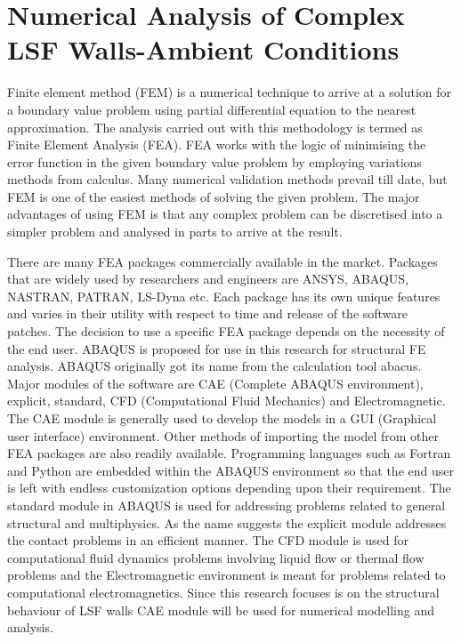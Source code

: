 \section{Numerical Analysis of Complex LSF Walls-Ambient Conditions}

Finite element method (FEM) is a numerical technique to arrive at a solution for a boundary value problem using partial differential equation to the nearest approximation. The analysis carried out with this methodology is termed as Finite Element Analysis (FEA). FEA works with the logic of minimising the error function in the given boundary value problem by employing variations methods from calculus. Many numerical validation methods prevail till date, but FEM is one of the easiest methods of solving the given problem. The major advantages of using FEM is that any complex problem can be discretised into a simpler problem and analysed in parts to arrive at the result. 

There are many FEA packages commercially available in the market. Packages that are widely used by researchers and engineers are ANSYS, ABAQUS, NASTRAN, PATRAN, LS-Dyna etc. Each package has its own unique features and varies in their utility with respect to time and release of the software patches. The decision to use a specific FEA package depends on the necessity of the end user. ABAQUS is proposed for use in this research for structural FE analysis. ABAQUS originally got its name from the calculation tool abacus. Major modules of the software are CAE (Complete ABAQUS environment), explicit, standard, CFD (Computational Fluid Mechanics) and Electromagnetic. The CAE module is generally used to develop the models in a GUI (Graphical user interface) environment. Other methods of importing the model from other FEA packages are also readily available. Programming languages such as Fortran and Python are embedded within the ABAQUS environment so that the end user is left with endless customization options depending upon their requirement. The standard module in ABAQUS is used for addressing problems related to general structural and multiphysics. As the name suggests the explicit module addresses the contact problems in an efficient manner. The CFD module is used for computational fluid dynamics problems involving liquid flow or thermal flow problems and the Electromagnetic environment is meant for problems related to computational electromagnetics. Since this research focuses is on the structural behaviour of LSF walls CAE module will be used for numerical modelling and analysis.

